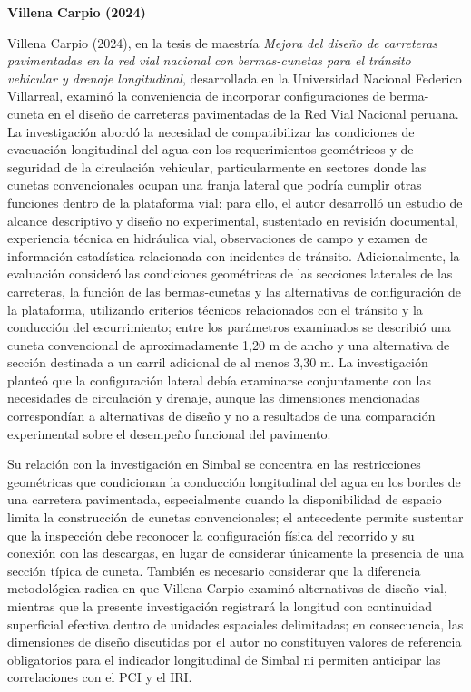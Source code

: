 
\noindent\textbf{Villena Carpio (2024)}

Villena Carpio (2024), en la tesis de maestría \textit{Mejora del diseño de carreteras pavimentadas en la red vial nacional con bermas-cunetas para el tránsito vehicular y drenaje longitudinal}, desarrollada en la Universidad Nacional Federico Villarreal, examinó la conveniencia de incorporar configuraciones de berma-cuneta en el diseño de carreteras pavimentadas de la Red Vial Nacional peruana. La investigación abordó la necesidad de compatibilizar las condiciones de evacuación longitudinal del agua con los requerimientos geométricos y de seguridad de la circulación vehicular, particularmente en sectores donde las cunetas convencionales ocupan una franja lateral que podría cumplir otras funciones dentro de la plataforma vial; para ello, el autor desarrolló un estudio de alcance descriptivo y diseño no experimental, sustentado en revisión documental, experiencia técnica en hidráulica vial, observaciones de campo y examen de información estadística relacionada con incidentes de tránsito. Adicionalmente, la evaluación consideró las condiciones geométricas de las secciones laterales de las carreteras, la función de las bermas-cunetas y las alternativas de configuración de la plataforma, utilizando criterios técnicos relacionados con el tránsito y la conducción del escurrimiento; entre los parámetros examinados se describió una cuneta convencional de aproximadamente 1,20 m de ancho y una alternativa de sección destinada a un carril adicional de al menos 3,30 m. La investigación planteó que la configuración lateral debía examinarse conjuntamente con las necesidades de circulación y drenaje, aunque las dimensiones mencionadas correspondían a alternativas de diseño y no a resultados de una comparación experimental sobre el desempeño funcional del pavimento.

Su relación con la investigación en Simbal se concentra en las restricciones geométricas que condicionan la conducción longitudinal del agua en los bordes de una carretera pavimentada, especialmente cuando la disponibilidad de espacio limita la construcción de cunetas convencionales; el antecedente permite sustentar que la inspección debe reconocer la configuración física del recorrido y su conexión con las descargas, en lugar de considerar únicamente la presencia de una sección típica de cuneta. También es necesario considerar que la diferencia metodológica radica en que Villena Carpio examinó alternativas de diseño vial, mientras que la presente investigación registrará la longitud con continuidad superficial efectiva dentro de unidades espaciales delimitadas; en consecuencia, las dimensiones de diseño discutidas por el autor no constituyen valores de referencia obligatorios para el indicador longitudinal de Simbal ni permiten anticipar las correlaciones con el PCI y el IRI.

